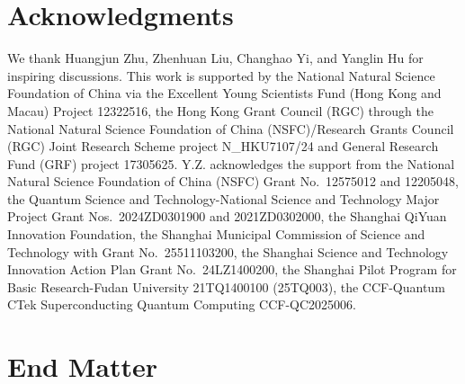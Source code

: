 \documentclass[aps,prl,twocolumn,nofootinbib,superscriptaddress,10pt]{revtex4-2}
\def\>{\rangle}
\def\<{\langle}
\DeclareMathOperator{\Tr}{tr}
\theoremstyle{plain}
\theoremstyle{definition}
\begin{document}


\section*{Acknowledgments}
We thank Huangjun Zhu, Zhenhuan Liu, Changhao Yi, and Yanglin Hu
for inspiring  discussions. 
This work is supported by
the National Natural Science Foundation of China via the Excellent Young Scientists Fund (Hong Kong and Macau) Project 12322516, the Hong Kong Grant Council (RGC) through the National Natural Science Foundation of China (NSFC)/Research Grants Council (RGC) Joint Research Scheme project N\_HKU7107/24 and General Research Fund (GRF) project 17305625. Y.Z. acknowledges the support from the National Natural Science Foundation of China (NSFC) Grant No.~12575012 and 12205048, the Quantum Science and Technology-National Science and Technology Major Project Grant Nos.~2024ZD0301900 and 2021ZD0302000, the Shanghai QiYuan Innovation Foundation, the Shanghai Municipal Commission of Science and Technology with Grant No.~25511103200, the Shanghai Science and Technology Innovation Action Plan Grant No.~24LZ1400200, the Shanghai Pilot Program for Basic Research-Fudan University 21TQ1400100 (25TQ003), the CCF-Quantum CTek Superconducting Quantum Computing CCF-QC2025006.



\onecolumngrid
\section*{End Matter}

\twocolumngrid
\end{document}
